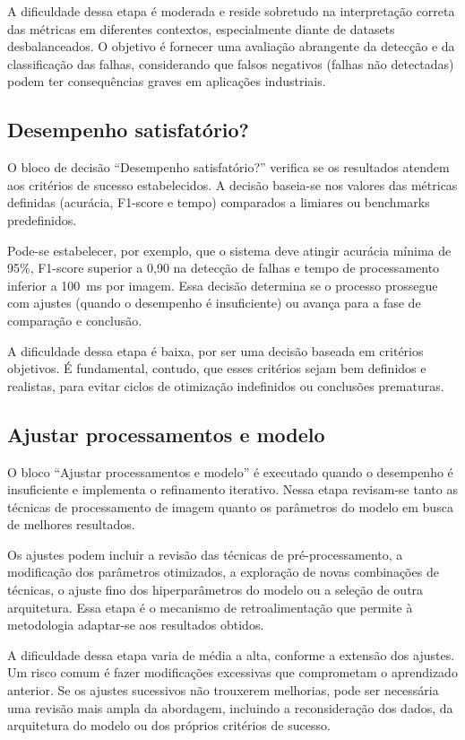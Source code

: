 A dificuldade dessa etapa é moderada e reside sobretudo na interpretação correta das métricas em diferentes contextos, especialmente diante de datasets desbalanceados. O objetivo é fornecer uma avaliação abrangente da detecção e da classificação das falhas, considerando que falsos negativos (falhas não detectadas) podem ter consequências graves em aplicações industriais.

\subsection{Desempenho satisfatório?}
O bloco de decisão ``Desempenho satisfatório?'' verifica se os resultados atendem aos critérios de sucesso estabelecidos. A decisão baseia-se nos valores das métricas definidas (acurácia, F1-score e tempo) comparados a limiares ou benchmarks predefinidos.

Pode-se estabelecer, por exemplo, que o sistema deve atingir acurácia mínima de 95\%, F1-score superior a 0,90 na detecção de falhas e tempo de processamento inferior a 100~ms por imagem. Essa decisão determina se o processo prossegue com ajustes (quando o desempenho é insuficiente) ou avança para a fase de comparação e conclusão.

A dificuldade dessa etapa é baixa, por ser uma decisão baseada em critérios objetivos. É fundamental, contudo, que esses critérios sejam bem definidos e realistas, para evitar ciclos de otimização indefinidos ou conclusões prematuras.

\subsection{Ajustar processamentos e modelo}
O bloco ``Ajustar processamentos e modelo'' é executado quando o desempenho é insuficiente e implementa o refinamento iterativo. Nessa etapa revisam-se tanto as técnicas de processamento de imagem quanto os parâmetros do modelo em busca de melhores resultados.

Os ajustes podem incluir a revisão das técnicas de pré-processamento, a modificação dos parâmetros otimizados, a exploração de novas combinações de técnicas, o ajuste fino dos hiperparâmetros do modelo ou a seleção de outra arquitetura. Essa etapa é o mecanismo de retroalimentação que permite à metodologia adaptar-se aos resultados obtidos.

A dificuldade dessa etapa varia de média a alta, conforme a extensão dos ajustes. Um risco comum é fazer modificações excessivas que comprometam o aprendizado anterior. Se os ajustes sucessivos não trouxerem melhorias, pode ser necessária uma revisão mais ampla da abordagem, incluindo a reconsideração dos dados, da arquitetura do modelo ou dos próprios critérios de sucesso.

